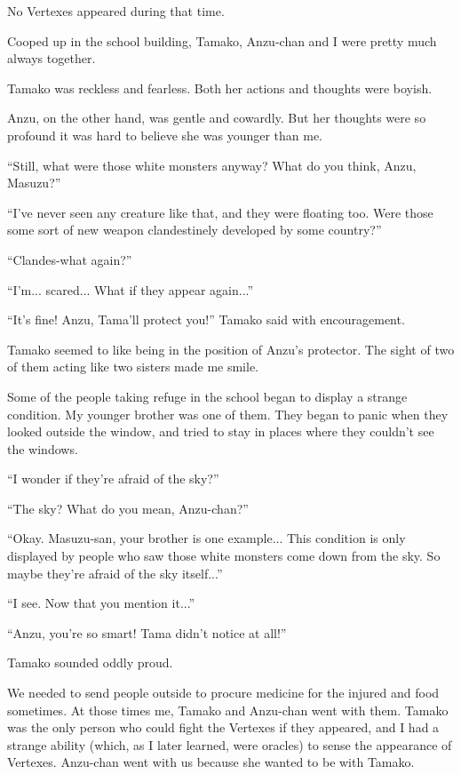 No Vertexes appeared during that time.

Cooped up in the school building, Tamako, Anzu-chan and I were pretty much always together.

Tamako was reckless and fearless. Both her actions and thoughts were boyish.

Anzu, on the other hand, was gentle and cowardly. But her thoughts were so profound it was hard to believe she was younger than me.

``Still, what were those white monsters anyway? What do you think, Anzu, Masuzu?''

``I've never seen any creature like that, and they were floating too. Were those some sort of new weapon clandestinely developed by some country?''

``Clandes-what again?''

``I'm... scared... What if they appear again...''

``It's fine! Anzu, Tama'll protect you!'' Tamako said with encouragement.

Tamako seemed to like being in the position of Anzu's protector. The sight of two of them acting like two sisters made me smile.

Some of the people taking refuge in the school began to display a strange condition. My younger brother was one of them. They began to panic when they looked outside the window, and tried to stay in places where they couldn't see the windows.

``I wonder if they're afraid of the sky?''

``The sky? What do you mean, Anzu-chan?''

``Okay. Masuzu-san, your brother is one example... This condition is only displayed by people who saw those white monsters come down from the sky. So maybe they're afraid of the sky itself...''

``I see. Now that you mention it...''

``Anzu, you're so smart! Tama didn't notice at all!''

Tamako sounded oddly proud.

We needed to send people outside to procure medicine for the injured and food sometimes. At those times me, Tamako and Anzu-chan went with them. Tamako was the only person who could fight the Vertexes if they appeared, and I had a strange ability (which, as I later learned, were oracles) to sense the appearance of Vertexes. Anzu-chan went with us because she wanted to be with Tamako.

